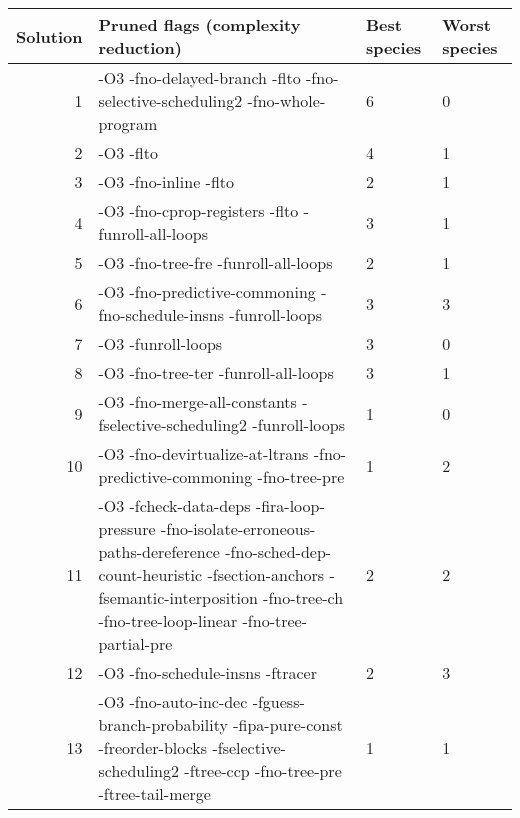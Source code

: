     \begin{tabular}{|r|p{4.5in}|p{0.5in}|p{0.5in}|}
     \hline
     \textbf{Solution} & \textbf{Pruned flags (complexity reduction)} & \textbf{Best species} & \textbf{Worst species} \\ 
     \hline
      1 & -O3 -fno-delayed-branch -flto -fno-selective-scheduling2 -fno-whole-program & 6 & 0 \\
     \hline
      2 & -O3 -flto & 4 & 1 \\
     \hline
      3 & -O3 -fno-inline -flto & 2 & 1 \\
     \hline
      4 & -O3 -fno-cprop-registers -flto -funroll-all-loops & 3 & 1 \\
     \hline
      5 & -O3 -fno-tree-fre -funroll-all-loops & 2 & 1 \\
     \hline
      6 & -O3 -fno-predictive-commoning -fno-schedule-insns -funroll-loops & 3 & 3 \\
     \hline
      7 & -O3 -funroll-loops & 3 & 0 \\
     \hline
      8 & -O3 -fno-tree-ter -funroll-all-loops & 3 & 1 \\
     \hline
      9 & -O3 -fno-merge-all-constants -fselective-scheduling2 -funroll-loops & 1 & 0 \\
     \hline
      10 & -O3 -fno-devirtualize-at-ltrans -fno-predictive-commoning -fno-tree-pre & 1 & 2 \\
     \hline
      11 & -O3 -fcheck-data-deps -fira-loop-pressure -fno-isolate-erroneous-paths-dereference -fno-sched-dep-count-heuristic -fsection-anchors -fsemantic-interposition -fno-tree-ch -fno-tree-loop-linear -fno-tree-partial-pre & 2 & 2 \\
     \hline
      12 & -O3 -fno-schedule-insns -ftracer & 2 & 3 \\
     \hline
      13 & -O3 -fno-auto-inc-dec -fguess-branch-probability -fipa-pure-const -freorder-blocks -fselective-scheduling2 -ftree-ccp -fno-tree-pre -ftree-tail-merge & 1 & 1 \\
     \hline
    \end{tabular}